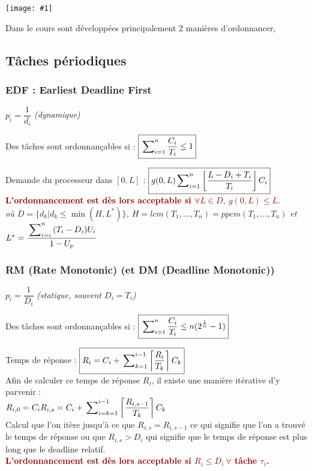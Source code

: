 \documentclass{article}
\newcommand{\dred}[1]{\textcolor{darkred}{\textbf{#1}}}
\newcommand{\ceil}[1]{\left\lceil #1 \right\rceil}
\newcommand{\cdil}[1]{\left\lfloor #1 \right\rfloor}
\newcommand{\imgR}[2]{\begin{center}\texttt{[image: \#1]}\end{center}}
\newcommand{\sumin}[3]{\sideset{}{_{i=#1}^{#2}}\sum{#3}}
\newcommand{\sumkn}[3]{\sideset{}{_{k=#1}^{#2}}\sum{#3}}
\begin{document}
\imgR{ITR_023.png}{200}

Dans le cours sont développées principalement 2 manières d'ordonnancer,

\subsection{Tâches périodiques}

\subsubsection{EDF : Earliest Deadline First}

\begin{center}$\boxed{p_i = \dfrac{1}{d_i}}$ \textit{(dynamique)}\end{center}

Des tâches sont ordonnançables si : $\boxed{\sideset{}{_{i=1}^n}\sum{\dfrac{C_i}{T_i}} \leq 1}$

Demande du processeur dans $[0,L]$ : $\boxed{g(0,L)\sumin{1}{n}{\cdil{\dfrac{L-D_i+T_i}{T_i}}C_i}}$ \\

\noindent\dred{L'ordonnancement est dès lors acceptable si $\forall L \in D,\ g(0,L) \leq L$}.\\
\textit{où $D =\{d_k|d_k\leq \min{(H,L^*)}\}$, $H = lcm(T_1,...,T_n)=ppcm(T_1,...,T_n)$ et
$L^*=\dfrac{\sumin{i}{n}{(T_i-D_i)U_i}}{1-U_p}$}

\subsubsection{RM (Rate Monotonic) (et DM (Deadline Monotonic))}

\begin{center}$\boxed{p_i = \dfrac{1}{D_i}}$ \textit{(statique, souvent $D_i=T_i$)}\end{center}

Des tâches sont ordonnançables si : $\boxed{\sideset{}{_{i=1}^n}\sum{\dfrac{C_i}{T_i}} \leq n(2^{\frac{1}
{n}}-1)}$

Temps de réponse : $\boxed{R_i = C_i + \sumkn{1}{i-1}{\ceil{\dfrac{R_i}{T_k}} C_k}}$ \\
Afin de calculer ce temps de réponse $R_i$, il existe une manière itérative d'y parvenir : \\
$R_{i,0} = C_i \\
 R_{i,s} = C_i + \sumin{k=1}{i-1}{\ceil{\dfrac{R_{i,s-1}}{T_k}} C_k}$ \\
 
Calcul que l'on itère jusqu'à ce que $R_{i,s} = R_{i,s-1}$ ce qui signifie que l'on a trouvé le temps de réponse
ou que $R_{i,s} > D_i$ qui signifie que le temps de réponse est plus long que le deadline relatif. \\
 
\noindent\dred{L'ordonnancement est dès lors acceptable si $R_i \leq D_i\ \forall$ tâche $\tau_i$.}
 
\end{document}
